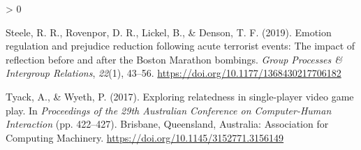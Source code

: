 \documentclass[
  english,
  man, noextraspace,floatsintext]{apa6}
\newlength{\cslhangindent}
\newenvironment{CSLReferences}[2] %
 {%
  \setlength{\parindent}{0pt}
  \ifodd #1 \everypar{\setlength{\hangindent}{\cslhangindent}}\ignorespaces\fi
  \ifnum #2 > 0
  \setlength{\parskip}{#2\baselineskip}
  \fi
 }%
 {}
\begin{document}
\begin{CSLReferences}{1}{0}
\leavevmode\hypertarget{ref-steeleEmotionRegulationPrejudice2019}{}%
Steele, R. R., Rovenpor, D. R., Lickel, B., \& Denson, T. F. (2019). Emotion regulation and prejudice reduction following acute terrorist events: {The} impact of reflection before and after the {Boston Marathon} bombings. \emph{Group Processes \& Intergroup Relations}, \emph{22}(1), 43--56. \url{https://doi.org/10.1177/1368430217706182}

\leavevmode\hypertarget{ref-tyackExploringRelatednessSingleplayer2017}{}%
Tyack, A., \& Wyeth, P. (2017). Exploring relatedness in single-player video game play. In \emph{Proceedings of the 29th {Australian Conference} on {Computer}-{Human Interaction}} (pp. 422--427). {Brisbane, Queensland, Australia}: {Association for Computing Machinery}. \url{https://doi.org/10.1145/3152771.3156149}

\end{CSLReferences}
\end{document}
